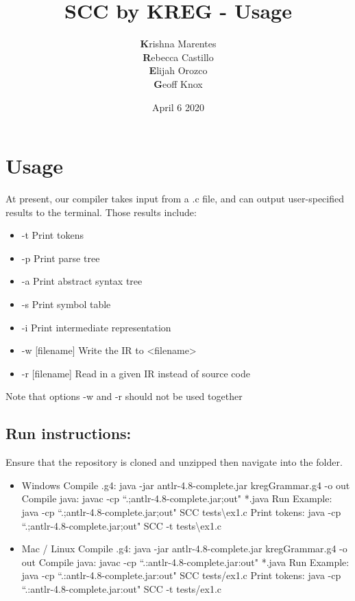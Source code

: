 \documentclass{article}
\title{SCC by KREG - Usage}
\author{\textbf{K}rishna Marentes\\\textbf{R}ebecca Castillo\\\textbf{E}lijah Orozco\\\textbf{G}eoff Knox}
\date{April 6 2020}
\begin{document}
\maketitle

\section{Usage}
At present, our compiler takes input from a .c file, and can output user-specified results to the terminal. Those results include:
\begin{itemize}
    \item -t Print tokens
    \item -p Print parse tree
    \item -a Print abstract syntax tree
    \item -s Print symbol table
    \item -i Print intermediate representation
    \item -w [filename] Write the IR to <filename>
    \item -r [filename] Read in a given IR instead of source code
\end{itemize}
Note that options -w and -r should not be used together

\subsection{Run instructions:}
Ensure that the repository is cloned and unzipped then navigate into the folder.
\begin{itemize}
    \item Windows
        \subitem Compile .g4: java -jar antlr-4.8-complete.jar kregGrammar.g4 -o out
        \subitem Compile java: javac -cp ``.;antlr-4.8-complete.jar;out" *.java
        \subitem Run Example: java -cp ``.;antlr-4.8-complete.jar;out" SCC tests\textbackslash ex1.c
        \subitem Print tokens: java -cp ``.;antlr-4.8-complete.jar;out" SCC -t tests\textbackslash ex1.c
    \item Mac / Linux
        \subitem Compile .g4: java -jar antlr-4.8-complete.jar kregGrammar.g4 -o out
        \subitem Compile java: javac -cp ``.:antlr-4.8-complete.jar:out" *.java
        \subitem Run Example: java -cp ``.:antlr-4.8-complete.jar:out" SCC tests/ex1.c
        \subitem Print tokens: java -cp ``.:antlr-4.8-complete.jar:out" SCC -t tests/ex1.c
\end{itemize}
\end{document}
